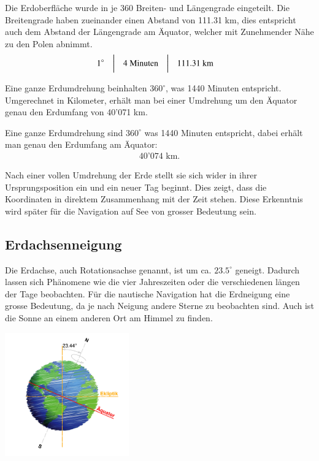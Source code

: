 \begin{refsection}
Die Erdoberfläche wurde in je 360 Breiten- und Längengrade eingeteilt. Die Breitengrade haben zueinander einen Abstand von 111.31 km, dies entspricht auch dem Abstand der Längengrade am Äquator, welcher mit Zunehmender Nähe zu den Polen abnimmt.
\[
\begin{aligned}
&1^{\circ}
&
&\text{\bigg \vert}
&
&4 \text{ Minuten}
&
&\text{\bigg \vert}
&
&111.31\text{ km}
\end{aligned}
\]

Eine ganze Erdumdrehung beinhalten $360 ^{\circ}$, was 1440 Minuten entspricht. Umgerechnet in Kilometer, erhält man bei einer Umdrehung um den Äquator genau den Erdumfang von 40’071 km.

Eine ganze Erdumdrehung sind $360 ^{\circ}$ was 1440 Minuten entspricht, dabei erhält man genau den Erdumfang am Äquator:
\begin{align*} 40’074 \text{ km.}\end{align*}

Nach einer vollen Umdrehung der Erde stellt sie sich wider in ihrer Ursprungsposition ein und ein neuer Tag beginnt. Dies zeigt, dass die Koordinaten in direktem Zusammenhang mit der Zeit stehen. Diese Erkenntnis wird später für die Navigation auf See von grosser Bedeutung sein.



\subsection{Erdachsenneigung}
Die Erdachse, auch Rotationsachse genannt, ist um ca. $23.5^{\circ}$ geneigt.
Dadurch lassen sich Phänomene wie die vier Jahreszeiten oder die verschiedenen längen der Tage beobachten.
Für die nautische Navigation hat die Erdneigung eine grosse Bedeutung, da je nach Neigung andere Sterne zu beobachten sind. Auch ist die Sonne an einem anderen Ort am Himmel zu finden.

\begin{center}
        \includegraphics[width=0.4\textwidth]{kugel/Ekliptik.jpg}
\end{center}


\end{refsection}

